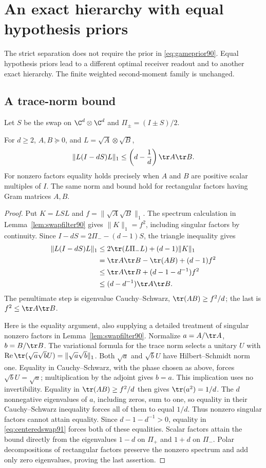 \section{An exact hierarchy with equal hypothesis priors}
\label{sec:equalprior91}
The strict separation does not require the prior in
\eqref{eq:gameprior90}.  Equal hypothesis priors lead to a different
optimal receiver readout and to another exact hierarchy.  The finite
weighted second-moment family is unchanged.

\subsection{A trace-norm bound}
Let $S$ be the swap on $\C^d\otimes\C^d$ and
$\Pi_\pm=(I\pm S)/2$.
\begin{lemma}\label{lem:centeredswap91}
For $d\ge2$, $A,B\succeq0$, and $L=\sqrt A\otimes\sqrt B$,
\begin{equation}\label{eq:centeredswap91}
 \|L(I-dS)L\|_1\le\left(d-\frac1d\right)\tr A\tr B.
\end{equation}
For nonzero factors equality holds precisely when $A$ and $B$ are
positive scalar multiples of $I$.  The same norm and bound hold for
rectangular factors having Gram matrices $A,B$.
\end{lemma}
\begin{proof}
Put $K=LSL$ and $f=\|\sqrt A\sqrt B\|_1$.
The spectrum calculation in Lemma~\ref{lem:swapfilter90} gives
$\|K\|_1=f^2$, including singular factors by continuity.
Since $I-dS=2\Pi_--(d-1)S$, the triangle inequality gives
\begin{align*}
 \|L(I-dS)L\|_1
 &\le 2\tr(L\Pi_-L)+(d-1)\|K\|_1\\
 &=\tr A\tr B-\tr(AB)+(d-1)f^2\\
 &\le\tr A\tr B+(d-1-d^{-1})f^2\\
 &\le(d-d^{-1})\tr A\tr B.
\end{align*}
The penultimate step is eigenvalue Cauchy--Schwarz,
$\tr(AB)\ge f^2/d$; the last is $f^2\le\tr A\tr B$.

Here is the equality argument, also supplying a detailed treatment of
singular nonzero factors in Lemma~\ref{lem:swapfilter90}.
Normalize $a=A/\tr A$, $b=B/\tr B$.  The variational formula for the
trace norm selects a unitary $U$ with
$\operatorname{Re}\tr(\sqrt a\sqrt b U)=\|\sqrt a\sqrt b\|_1$.
Both $\sqrt a$ and $\sqrt b U$ have Hilbert--Schmidt norm one.
Equality in Cauchy--Schwarz, with the phase chosen as above, forces
$\sqrt b U=\sqrt a$; multiplication by the adjoint gives $b=a$.
This implication uses no invertibility.  Equality in
$\tr(AB)\ge f^2/d$ then gives $\tr(a^2)=1/d$.  The $d$
nonnegative eigenvalues of $a$, including zeros, sum to one, so equality
in their Cauchy--Schwarz inequality forces all of them to equal $1/d$.
Thus nonzero singular factors cannot attain equality.  Since
$d-1-d^{-1}>0$, equality in \eqref{eq:centeredswap91} forces both
of these equalities.  Scalar factors attain the bound directly from
the eigenvalues $1-d$ on $\Pi_+$ and $1+d$ on $\Pi_-$.
Polar decompositions of rectangular factors preserve the nonzero
spectrum and add only zero eigenvalues, proving the last assertion.
\end{proof}

